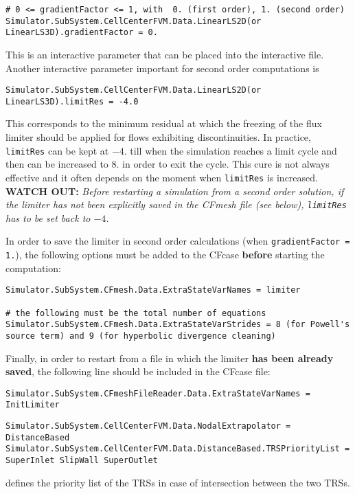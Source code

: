 \documentclass[11pt]{article}
\begin{document}
\begin{lstlisting}[breaklines]
# 0 <= gradientFactor <= 1, with  0. (first order), 1. (second order)
Simulator.SubSystem.CellCenterFVM.Data.LinearLS2D(or LinearLS3D).gradientFactor = 0.
\end{lstlisting}
This is an interactive parameter that can be placed into the interactive file. Another interactive parameter important for second order computations is 

\begin{lstlisting}[breaklines]
Simulator.SubSystem.CellCenterFVM.Data.LinearLS2D(or LinearLS3D).limitRes = -4.0
\end{lstlisting}
This corresponds to the minimum residual at which the freezing of the flux limiter should be applied for flows exhibiting discontinuities. 
In practice, {\tt limitRes} can be kept at  $-4.$ till when the simulation reaches a limit cycle and then can be increased to
$8.$ in order to exit the cycle. This cure is not always effective and it often depends on the moment when {\tt limitRes} is increased.\\
{\bf WATCH OUT:} {\it Before restarting a simulation from a second order solution, if the limiter has not been explicitly saved in the CFmesh file 
  (see below), {\tt limitRes} has to be set back to $-4$.}

In order to save the limiter in second order calculations (when {\tt gradientFactor = 1.}), the following options must be added to the CFcase {\bf before} 
starting the computation:

\begin{lstlisting}[breaklines]
Simulator.SubSystem.CFmesh.Data.ExtraStateVarNames = limiter

# the following must be the total number of equations
Simulator.SubSystem.CFmesh.Data.ExtraStateVarStrides = 8 (for Powell's source term) and 9 (for hyperbolic divergence cleaning)
\end{lstlisting}

Finally, in order to restart from a file in which the limiter {\bf has been already saved}, 
the following line should be included in the CFcase file:

\begin{lstlisting}[breaklines]
Simulator.SubSystem.CFmeshFileReader.Data.ExtraStateVarNames = InitLimiter
\end{lstlisting}

\begin{lstlisting}[breaklines]
Simulator.SubSystem.CellCenterFVM.Data.NodalExtrapolator = DistanceBased
Simulator.SubSystem.CellCenterFVM.Data.DistanceBased.TRSPriorityList = SuperInlet SlipWall SuperOutlet
\end{lstlisting}
defines the priority list of the TRSs in case of intersection between the two TRSs.
\end{document}

